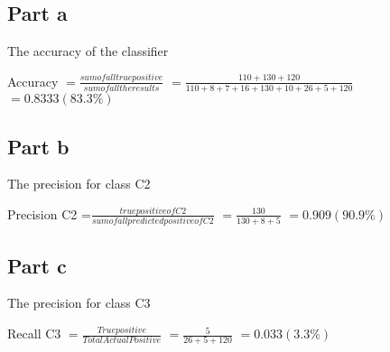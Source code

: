 \documentclass[a4paper, 10pt]{article}
\begin{document}
\subsection{Part a}
The accuracy of the classifier

Accuracy $=\frac{sum of all true positive}{sum of all the results}$
         $=\frac{110+130+120}{110+8+7+16+130+10+26+5+120}$
         $= 0.8333 (83.3 \% )$
          
\subsection{Part b}

The precision for class C2

Precision C2 =$\frac{true positive of C2}{sum of all predicted positive of C2}$
             $=\frac{130}{130+8+5}$ 
             $=0.909 (90.9\%)$

\subsection{Part c}

The precision for class C3

Recall C3 $=\frac{True positive}{Total Actual Positive}$
          $=\frac{5}{26+5+120}$
          $=0.033 (3.3 \% )$
\end{document}
